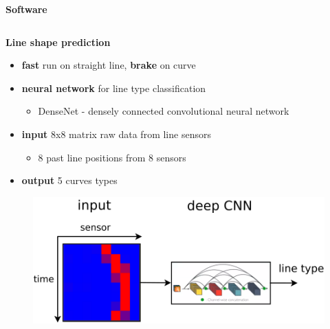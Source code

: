 \documentclass[xcolor=dvipsnames]{beamer}
\begin{document}
\begin{frame}{\bf Software}
\begin{columns}
\begin{column}{0.5\textwidth}
    \end{column}




\end{columns}

\end{frame}


\begin{frame}{\bf Line shape prediction}

\begin{itemize}
    \item {\bf fast} run on straight line, {\bf brake} on curve
    \item {\bf neural network} for line type classification
        \begin{itemize}
            \item DenseNet - densely connected convolutional neural network
        \end{itemize}
    \item {\bf input} 8x8 matrix raw data from line sensors
        \begin{itemize}
            \item 8 past line positions from 8 sensors
        \end{itemize}
    \item {\bf output} 5 curves types
\end{itemize}

\begin{figure}
    \includegraphics[scale=0.3]{../../diagrams/line_classification.png}
\end{figure}

\end{frame}
\end{document}
